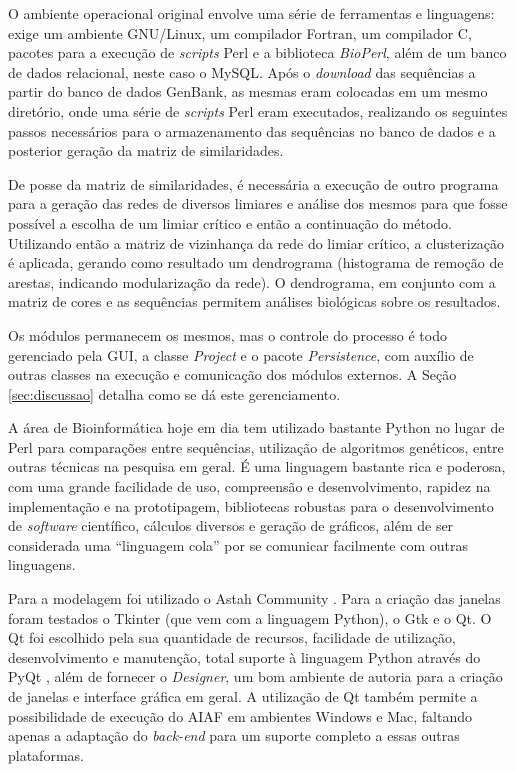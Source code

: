 O ambiente operacional original
envolve uma série de ferramentas e linguagens: exige um ambiente GNU/Linux, um compilador Fortran, um compilador C, pacotes para
a execução de \textit{scripts} Perl e a biblioteca \textit{BioPerl}, além de um banco de dados relacional, neste caso o MySQL. Após o \textit{download} das
sequências a partir do banco de dados GenBank, as mesmas eram colocadas em um mesmo diretório, onde uma série de \textit{scripts} Perl eram executados,
realizando os seguintes passos necessários para o armazenamento das sequências no banco de dados e a posterior geração da matriz de similaridades.

De posse da matriz de similaridades, é necessária a execução de outro programa para a geração das redes de diversos limiares e análise dos mesmos para que
fosse possível a escolha de um limiar crítico e então a continuação do método.
Utilizando então a matriz de vizinhança da rede do limiar crítico, a clusterização é aplicada, gerando como
resultado um dendrograma (histograma de remoção de arestas, indicando modularização da rede). O dendrograma, em conjunto com a matriz de cores e as sequências
permitem análises biológicas sobre os resultados.

Os módulos permanecem os mesmos, mas o controle do processo é todo gerenciado pela GUI, a classe \textit{Project} e o pacote \textit{Persistence},
com auxílio de
outras classes na execução e comunicação dos módulos externos. A Seção \ref{sec:discussao} detalha como se dá este gerenciamento.

A área de Bioinformática hoje em dia tem utilizado bastante Python \cite{python} no lugar de Perl para comparações entre sequências, utilização de algoritmos
genéticos, entre outras técnicas na pesquisa em geral. É uma linguagem bastante rica e poderosa, com uma grande facilidade de uso, compreensão e
desenvolvimento, rapidez na implementação e na prototipagem, bibliotecas robustas para o desenvolvimento de \textit{software} científico, cálculos
diversos e geração de gráficos, além de ser considerada uma ``linguagem cola'' por se comunicar facilmente com outras linguagens.

Para a modelagem foi utilizado o Astah Community \cite{astah}. Para a criação das janelas foram testados o Tkinter (que vem com a linguagem Python), o Gtk
e o Qt. O Qt foi escolhido pela sua quantidade de recursos, facilidade de utilização, desenvolvimento e manutenção, total suporte à linguagem Python através
do PyQt \cite{pyqt}, além de fornecer o \textit{Designer}, um bom ambiente de autoria para a criação de janelas e interface gráfica em geral.
A utilização de Qt também permite a possibilidade de execução do AIAF em ambientes Windows e Mac,
faltando apenas a adaptação do \textit{back-end} para um suporte completo a essas outras plataformas.

